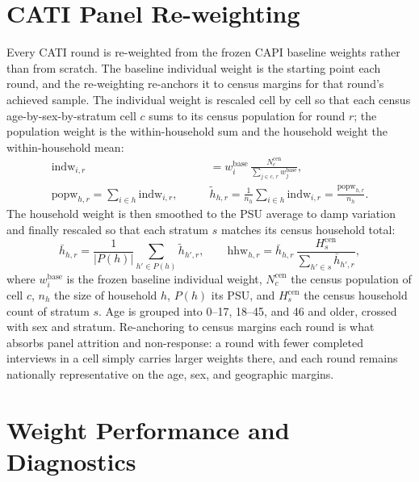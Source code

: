 \documentclass[AEJ]{AEA}
\begin{document}
\section{CATI Panel Re-weighting}

Every CATI round is re-weighted from the frozen CAPI baseline weights rather than
from scratch. The baseline individual weight is the starting point each round, and
the re-weighting re-anchors it to census margins for that round's achieved sample.
The individual weight is rescaled cell by cell so that each census
age-by-sex-by-stratum cell $c$ sums to its census population for round $r$; the
population weight is the within-household sum and the household weight the
within-household mean:
%
\begin{align}
\mathrm{indw}_{i,r}
&= w^{\mathrm{base}}_i\,
\frac{N^{\mathrm{cen}}_{c}}{\sum_{j\in c,\,r} w^{\mathrm{base}}_j},
\\[2pt]
\mathrm{popw}_{h,r} = \sum_{i\in h}\mathrm{indw}_{i,r},
\qquad
&\tilde{h}_{h,r} = \frac{1}{n_h}\sum_{i\in h}\mathrm{indw}_{i,r}
= \frac{\mathrm{popw}_{h,r}}{n_h}.
\end{align}
%
The household weight is then smoothed to the PSU average to damp variation and
finally rescaled so that each stratum $s$ matches its census household total:
%
\begin{equation}
\bar{h}_{h,r} = \frac{1}{|P(h)|}\sum_{h'\in P(h)}\tilde{h}_{h',r},
\qquad
\mathrm{hhw}_{h,r} = \bar{h}_{h,r}\,
\frac{H^{\mathrm{cen}}_{s}}{\sum_{h'\in s}\bar{h}_{h',r}},
\end{equation}
%
where $w^{\mathrm{base}}_i$ is the frozen baseline individual weight,
$N^{\mathrm{cen}}_{c}$ the census population of cell $c$, $n_h$ the size of
household $h$, $P(h)$ its PSU, and $H^{\mathrm{cen}}_{s}$ the census household count
of stratum $s$. Age is grouped into 0--17, 18--45, and 46 and older, crossed with
sex and stratum. Re-anchoring to census margins each round is what absorbs panel
attrition and non-response: a round with fewer completed interviews in a cell
simply carries larger weights there, and each round remains nationally
representative on the age, sex, and geographic margins.

\section{Weight Performance and Diagnostics}
\end{document}
